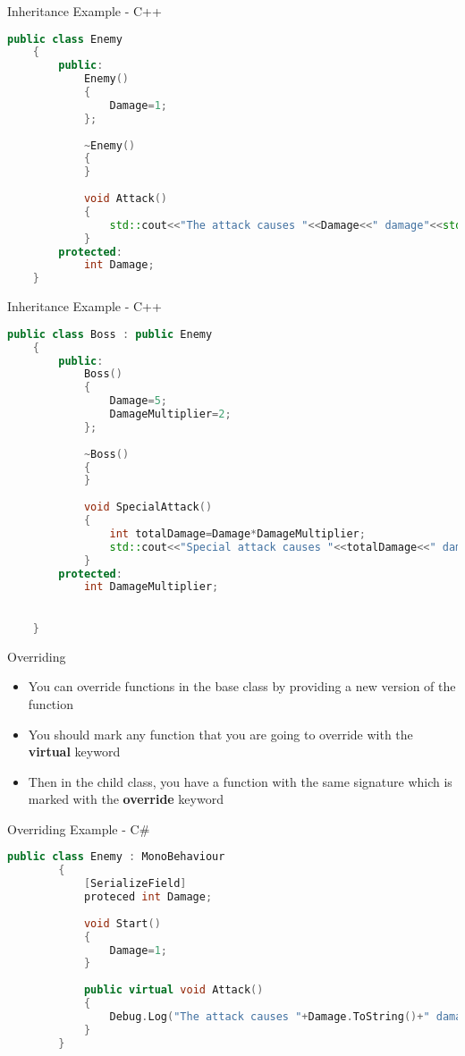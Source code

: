 \begin{frame}[fragile]{Inheritance Example - C++}
	\begin{lstlisting}[language=C++,basicstyle=\tiny,]
	public class Enemy
	{
		public:
			Enemy()
			{
				Damage=1;
			};
			
			~Enemy()
			{
			}
			
			void Attack()
			{
				std::cout<<"The attack causes "<<Damage<<" damage"<<std::endl;
			}
		protected:
			int Damage;
	}
	\end{lstlisting}
\end{frame}

\begin{frame}[fragile]{Inheritance Example - C++}
	\begin{lstlisting}[language=C++,basicstyle=\tiny,]
	public class Boss : public Enemy
	{
		public:
			Boss()
			{
				Damage=5;
				DamageMultiplier=2;
			};
			
			~Boss()
			{
			}
			
			void SpecialAttack()
			{
				int totalDamage=Damage*DamageMultiplier;
				std::cout<<"Special attack causes "<<totalDamage<<" damage"<<std::endl;
			}	
		protected:
			int DamageMultiplier;
		

	}
	\end{lstlisting}
\end{frame}

\begin{frame}{Overriding}
	\begin{itemize}
		\pause \item You can override functions in the base class by providing a new version of the function
		\pause \item You should mark any function that you are going to override with the \textbf{virtual} keyword 
		\pause \item Then in the child class, you have a function with the same signature which is marked with the \textbf{override} keyword
	\end{itemize}
\end{frame}

\begin{frame}[fragile]{Overriding Example - C\#}
	\begin{lstlisting}[language=C++,basicstyle=\tiny,]
		public class Enemy : MonoBehaviour
		{
			[SerializeField]
			proteced int Damage;
		
			void Start()
			{
				Damage=1;
			}
		
			public virtual void Attack()
			{
				Debug.Log("The attack causes "+Damage.ToString()+" damage");
			}
		}
	\end{lstlisting}
\end{frame}

